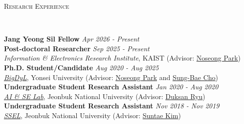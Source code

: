 \documentclass[10pt]{article}
\newenvironment{changemargin}[2]{
  \begin{list}{}{
    \setlength{\topsep}{0pt}
    \setlength{\leftmargin}{#1}
    \setlength{\rightmargin}{#2}
    \setlength{\listparindent}{\parindent}
    \setlength{\itemindent}{\parindent}
    \setlength{\parsep}{\parskip}
  }
  \item[]}{\end{list}
}
\newcommand{\lineover}{
	\begin{changemargin}{-0.05in}{-0.05in}
		\vspace*{-8pt}
		\hrulefill \\
		\vspace*{-2pt}
	\end{changemargin}
}
\newcommand{\header}[1]{
	\begin{changemargin}{-0.5in}{-0.5in}
		\scshape{#1}\\
  	\lineover
	\end{changemargin}
}
\newenvironment{body} {
	\vspace*{-16pt}
	\begin{changemargin}{-0.25in}{-0.5in}
  }
	{\end{changemargin}
}
\begin{document}
\header{Research Experience}
\begin{body}
	\vspace{14pt}
	\textbf{Jang Yeong Sil Fellow} \hfill \emph{Apr 2026 - Present} \\
	\textbf{Post-doctoral Researcher} \hfill \emph{Sep 2025 - Present} \\
	\emph{Information \& Electronics Research Institute}, KAIST (Advisor: {\href{https://scholar.google.com/citations?user=VSuM3gYAAAAJ}{Noseong Park}})\\
	\textbf{Ph.D. Student/Candidate} \hfill \emph{Aug 2020 - Aug 2025} \\
	\emph{\href{https://sites.google.com/view/npark}{BigDyL}}, Yonsei University (Advisor: \href{https://scholar.google.com/citations?user=VSuM3gYAAAAJ&hl=en}{Noseong Park} and \href{https://scholar.google.com/citations?user=px5LGgMAAAAJ&hl=en}{Sung-Bae Cho}) \\
	\textbf{Undergraduate Student Research Assistant} \hfill \emph{Jan 2020 - Aug 2020} \\
	\emph{\href{https://sites.google.com/view/aiselabjbnu}{AI \& SE Lab}}, Jeonbuk National University (Advisor: {\href{https://scholar.google.com/citations?user=BHue-MMAAAAJ&hl=en}{Duksan Ryu}})  \\
	\textbf{Undergraduate Student Research Assistant} \hfill \emph{Nov 2018 - Nov 2019} \\
	\emph{\href{https://sites.google.com/view/jbnussel/}{SSEL}}, Jeonbuk National University (Advisor: {\href{https://scholar.google.com/citations?user=IN_HTKEAAAAJ&hl=en}{Suntae Kim}})  \\
\end{body}
\medskip
\end{document}
